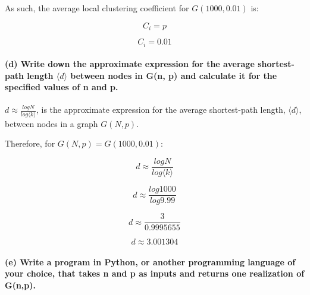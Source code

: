 \documentclass[11pt]{article}
\begin{document}
As such, the average local clustering coefficient for \(G(1000,0.01)\)
is:

\[C_i = p\]

\[C_i = 0.01\]

\paragraph{(d) Write down the approximate expression for the average
shortest-path length \(\langle{d}\rangle\) between nodes in G(n, p) and calculate it for
the specified values of n and
p.\newline \newline}\label{write-down-the-approximate-expression-for-the-average-shortest-path-length-d-between-nodes-in-gn-p-and-calculate-it-for-the-specified-values-of-n-and-p.}

\(d \approx \frac{logN}{log\langle{k}\rangle}\), is the approximate
expression for the average shortest-path length, \(\langle{d}\rangle\),
between nodes in a graph \(G(N,p)\).\newline

Therefore, for \(G(N,p) = G(1000,0.01)\):

\[d \approx \frac{logN}{log\langle{k}\rangle}\]

\[d \approx \frac{log1000}{log9.99}\]

\[d \approx \frac{3}{0.9995655}\]

\[d \approx 3.001304\]

\paragraph{(e) Write a program in Python, or another programming language of
your choice, that takes n and p as inputs and returns one realization of
G(n,p).}\label{write-a-program-in-python-or-another-programming-language-of-your-choice-that-takes-nand-p-as-inputs-and-returns-one-realization-of-gn-p.}
\end{document}
